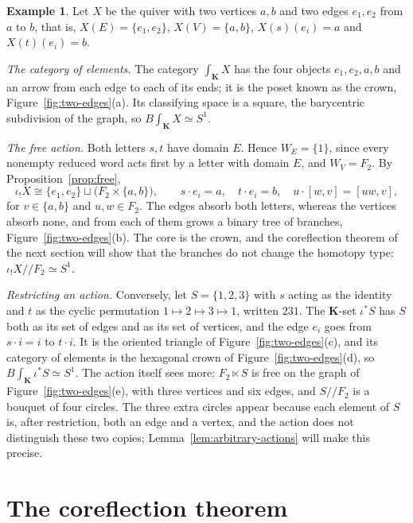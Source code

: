 \documentclass[11pt]{amsart}
\theoremstyle{definition}
\newtheorem{example}[teo]{Example}
\theoremstyle{remark}
\numberwithin{figure}{section}%
\begin{document}
\begin{example}
\label{ex:two-edges}
Let $X$ be the quiver with two vertices $a,b$ and two edges $e_1,e_2$ from $a$ to $b$, that is, $X(E)=\{e_1,e_2\}$, $X(V)=\{a,b\}$, $X(s)(e_i)=a$ and $X(t)(e_i)=b$.

\emph{The category of elements.} The category $\int_{\mathbf K}X$ has the four objects $e_1,e_2,a,b$ and an arrow from each edge to each of its ends; it is the poset known as the crown, Figure~\ref{fig:two-edges}(a). Its classifying space is a square, the barycentric subdivision of the graph, so $B\!\int_{\mathbf K}X\simeq S^1$.

\emph{The free action.} Both letters $s,t$ have domain $E$. Hence $W_E=\{1\}$, since every nonempty reduced word acts first by a letter with domain $E$, and $W_V=F_2$. By Proposition~\ref{prop:free},
\[
\iota_!X\cong\{e_1,e_2\}\sqcup\big(F_2\times\{a,b\}\big),\qquad
s\cdot e_i=a,\quad t\cdot e_i=b,\quad u\cdot[w,v]=[uw,v],
\]
for $v\in\{a,b\}$ and $u,w\in F_2$. The edges absorb both letters, whereas the vertices absorb none, and from each of them grows a binary tree of branches, Figure~\ref{fig:two-edges}(b). The core is the crown, and the coreflection theorem of the next section will show that the branches do not change the homotopy type: $\iota_!X/\!/F_2\simeq S^1$.

\emph{Restricting an action.} Conversely, let $S=\{1,2,3\}$ with $s$ acting as the identity and $t$ as the cyclic permutation $1\mapsto2\mapsto3\mapsto1$, written $231$. The $\mathbf K$-set $\iota^*S$ has $S$ both as its set of edges and as its set of vertices, and the edge $e_i$ goes from $s\cdot i=i$ to $t\cdot i$. It is the oriented triangle of Figure~\ref{fig:two-edges}(c), and its category of elements is the hexagonal crown of Figure~\ref{fig:two-edges}(d), so $B\!\int_{\mathbf K}\iota^*S\simeq S^1$. The action itself sees more: $F_2\ltimes S$ is free on the graph of Figure~\ref{fig:two-edges}(e), with three vertices and six edges, and $S/\!/F_2$ is a bouquet of four circles. The three extra circles appear because each element of $S$ is, after restriction, both an edge and a vertex, and the action does not distinguish these two copies; Lemma~\ref{lem:arbitrary-actions} will make this precise.
\end{example}

\section{The coreflection theorem}\label{sec:coref}
\end{document}
